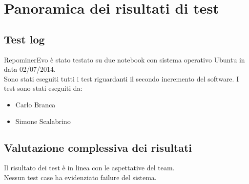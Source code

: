 \chapter{Panoramica dei risultati di test}

\section{Test log}

RepominerEvo è stato testato su due notebook con sistema operativo Ubuntu in data 02/07/2014.\\
Sono stati eseguiti tutti i test riguardanti il secondo incremento del software.
I test sono stati eseguiti da:
\begin{itemize}
\item Carlo Branca
\item Simone Scalabrino
\end{itemize}

\section{Valutazione complessiva dei risultati}

Il risultato dei test è in linea con le aspettative del team.\\
Nessun test case ha evidenziato failure del sistema.\\

\clearpage